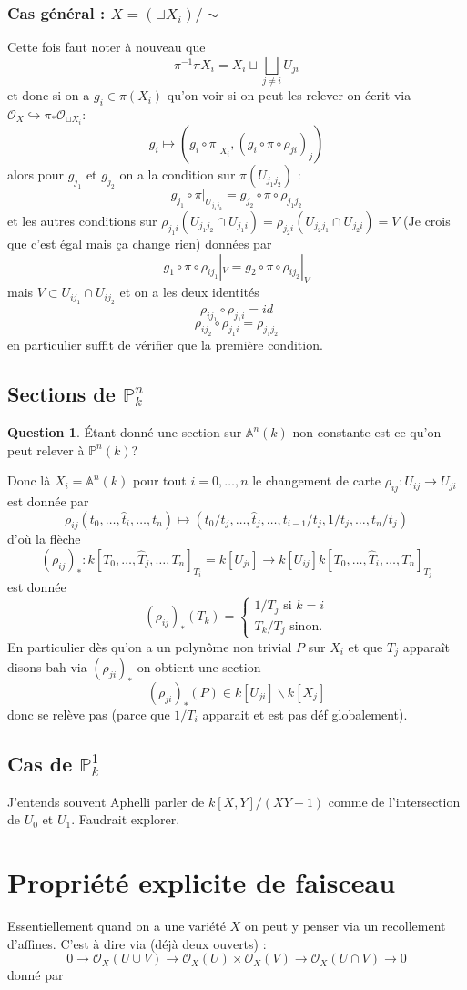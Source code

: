 \documentclass[a4paper,12pt]{book}
\newcommand{\A}{\mathbb{A}}
\newcommand{\Or}{\mathcal{O}}
\renewcommand{\Pr}{\mathbb{P}}
\theoremstyle{plain}
\theoremstyle{definition}
\newtheorem{quest}{Question}
\theoremstyle{remark}
\begin{document}
\subsection{Cas général : $X=(\sqcup X_i)/\sim$}
Cette fois faut noter à nouveau que 
\[\pi^{-1}\pi X_i=X_i\sqcup\bigsqcup_{j\ne i} U_{ji}\]
et donc si on a $g_i\in \pi(X_i)$ qu'on voir si on peut les 
relever on écrit via $\Or_X\hookrightarrow \pi_*\Or_{\sqcup X_i}$:
\[g_i\mapsto (g_i\circ \pi|_{X_i}, (g_i\circ\pi\circ\rho_{ji})_j)\]
alors pour $g_{j_1}$ et $g_{j_2}$ on a la condition sur 
$\pi(U_{j_1j_2})$ :
\[g_{j_1}\circ\pi|_{U_{j_1j_2}}=g_{j_2}\circ\pi\circ\rho_{j_1j_2}\]
et les autres conditions sur $\rho_{j_1i}(U_{j_1j_2}\cap U_{j_1i})=
\rho_{j_2i}(U_{j_2j_1}\cap U_{j_2i})=V$ (Je crois que c'est égal
mais ça change rien) données par 
\[g_1\circ\pi\circ\rho_{ij_1}|_V=g_2\circ\pi\circ \rho_{ij_2}|_V\]
mais $V\subset U_{ij_1}\cap U_{ij_2}$ et on a les deux identités
\[\rho_{ij_1}\circ\rho_{j_1i}=id\]
\[\rho_{ij_2}\circ\rho_{j_1i}=\rho_{j_1j_2}\]
en particulier suffit de vérifier que la première condition.

\section{Sections de $\Pr_k^n$}
\begin{quest}
  Étant donné une section sur $\A^n(k)$ non constante est-ce 
qu'on peut relever à $\Pr^n(k)$?
\end{quest}
Donc là $X_i=\A^n(k)$ pour tout $i=0,\ldots, n$ le changement de
carte 
$\rho_{ij}\colon U_{ij}\to U_{ji}$ est donnée par 
\[\rho_{ij}(t_0,\ldots,\hat t_i,\ldots, t_n)\mapsto (t_0/t_j,\ldots,\hat t_j, \ldots, t_{i-1}/t_j,1/t_j,\ldots, t_n/t_j)\]
d'où la flèche
\[(\rho_{ij})_*\colon k[T_0,\ldots, \hat T_j, \ldots, T_n]_{T_i}=k[U_{ji}]\to k[U_{ij}] k[T_0,\ldots,\hat T_i,\ldots, T_n]_{T_j}\]
est donnée \[(\rho_{ij})_*(T_k)=\begin{cases} 1/T_j\textrm{ si $k=i$}\\ T_k/T_j\textrm{ sinon.}\end{cases}\]
En particulier dès qu'on a un polynôme non trivial $P$ sur $X_i$ et
que $T_j$ apparaît disons bah via $(\rho_{ji})_*$ on obtient 
une section \[(\rho_{ji})_*(P)\in k[U_{ji}]\backslash k[X_j]\] donc
se relève pas (parce que $1/T_i$ apparait et est pas déf 
globalement).
\section{Cas de $\Pr_k^1$}
J'entends souvent Aphelli parler de $k[X,Y]/(XY-1)$ comme de 
l'intersection de $U_0$ et $U_1$. Faudrait explorer.




\chapter{Propriété explicite de faisceau}
Essentiellement quand on a une variété $X$
on peut y penser via un recollement d'affines.
C'est à dire via (déjà deux ouverts) :
\[0\to \Or_X(U\cup V)\to \Or_X(U)\times
\Or_X(V)\to \Or_X(U\cap V)\to 0\]
donné par 




\printbibliography
\end{document}
